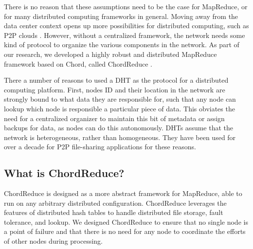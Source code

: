 There is no reason that these assumptions need to be the case for MapReduce, or for many distributed computing frameworks in general.
Moving away from the data center context opens up more possibilities for distributed computing, such as P2P clouds \cite{p2p-cloud}.
However, without a centralized framework, the network needs some kind of protocol to organize the various components in the network.
As part of our research, we developed a highly robust and distributed MapReduce framework based on Chord, called ChordReduce \cite{chordreduce}.

There a number of reasons to used a DHT as the protocol for a distributed computing platform.
First, nodes ID and their location in the network are strongly bound to what data they are responsible for, such that any node can lookup which node is responsible a particular piece of data.
This obviates the need for a centralized organizer to maintain this bit of metadata or assign backups for data, as nodes can do this autonomously.
DHTs assume that the network is heterogeneous, rather than homogeneous.
They have been used for over a decade for P2P file-sharing applications for these reasons.




\subsection{What is ChordReduce?}

ChordReduce \cite{chordreduce} is designed as a more abstract framework for MapReduce, able to run on any arbitrary distributed configuration.
ChordReduce leverages the features of distributed hash tables to handle distributed file storage, fault tolerance, and lookup.
We designed ChordReduce to ensure that no single node is a point of failure and that there is no need for any node to coordinate the efforts of other nodes during processing.

